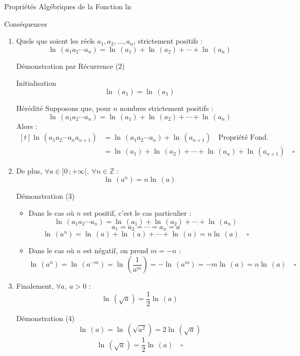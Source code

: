\documentclass{coursbook}
\begin{document}
\begin{Gpartie}{Propriétés Algébriques de la Fonction ln}
\begin{Spartie}{Conséquences}
\begin{enumerate}[(1)]
\begin{SSpartie}{Démonstration (1)}
                    La deuxième égalité est le cas particulier où $a=1$.$\quad\square$
                \end{SSpartie}
                \item Quels que soient les réels $a_1, a_2,\dotsc, a_n$, strictement positifs : 
                \[\boxed{\ln\,(a_1a_2\dotsb a_n)=\ln\,(a_1)+\ln\,(a_2)+\dotsb+\ln\,(a_n)}\]
                \begin{SSpartie}{Démonstration par Récurrence (2)}
                    \begin{SSSpartie}{Initialisation}
                        \[\ln\,(a_1)=\ln\,(a_1)\]
                    \end{SSSpartie}
                    \begin{SSSpartie}{Hérédité}
                        Supposons que, pour $n$ nombres strictement positifs :
                        \[\ln\,(a_1a_2\dotsb a_n)=\ln\,(a_1)+\ln\,(a_2)+\dotsb+\ln\,(a_n)\]
                        Alors :
                        \[\begin{aligned}[t]
                            \ln\,(a_1a_2\dotsb a_na_{n+1})&=\ln\,(a_1a_2\dotsb a_n)+\ln\,(a_{n+1})\quad\text{Propriété Fond.} \\
                            &=\ln\,(a_1)+\ln\,(a_2)+\dotsb+\ln\,(a_n)+\ln\,(a_{n+1})\quad\square
                        \end{aligned}\]
                    \end{SSSpartie}
                \end{SSpartie}
                \item De plus, $\forall a\in\big]0\,;+\infty\big[,~\forall n\in\mathbb{Z}$ :
                \[\boxed{\ln\,\left(a^n\right)=n\ln\,(a)}\]
                \begin{SSpartie}{Démonstration (3)}
                    \begin{itemize}
                        \item Dans le cas où $n$ est positif, c'est le cas particulier :
                        \[\ln\,(a_1a_2\dotsb a_n)=\ln\,(a_1)+\ln\,(a_2)+\dotsb+\ln\,(a_n)\]
                        \[a_1=a_2=\dotsb=a_n=a\]
                        \[\ln\,(a^n)=\ln\,(a)+\ln\,(a)+\dotsb+\ln\,(a)=n\ln\,(a)\quad\square\]
                        \item Dans le cas où $n$ est négatif, on prend $m=-n$ :
                        \[\ln\,(a^n)=\ln\,(a^{-m})=\ln\,\left(\frac{1}{a^m}\right)=-\ln\,(a^m)=-m\ln\,(a)=n\ln\,(a)\quad\square\]
                    \end{itemize}
                \end{SSpartie}
                \item Finalement, $\forall a,~a>0$ :
                \[\ln\,\left(\sqrt{a}\right)=\frac{1}{2}\ln\,(a)\]
                \begin{SSpartie}{Démonstration (4)}
                    \[\ln\,(a)=\ln\,\left(\sqrt{a^2}\right)=2\ln\,\left(\sqrt{a}\right)\]
                    \[\ln\,\left(\sqrt{a}\right)=\frac{1}{2}\ln\,(a)\quad\square\]


\end{SSpartie}
\end{enumerate}
\end{Spartie}
\end{Gpartie}
\end{document}

